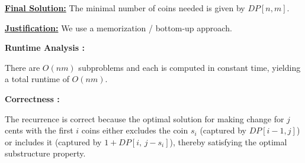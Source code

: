 \documentclass[11pt]{article}
\begin{document}
    \medskip
    
    \underline{\textbf{Final Solution:}} The minimal number of coins needed is given by \(DP[n,m]\).
    
    \medskip
    
    \underline{\textbf{Justification:}} We use a memorization / bottom-up approach. 

    \textbf{Runtime Analysis :}
    
    There are \(O(nm)\) subproblems and each is computed in constant time, yielding a total runtime of \(O(nm)\). 
    
    \textbf{Correctness :}

    The recurrence is correct because the optimal solution for making change for \(j\) cents with the first \(i\) coins either excludes the coin \(s_i\) (captured by \(DP[i-1,j]\)) or includes it (captured by \(1+DP[i,\, j-s_i]\)), thereby satisfying the optimal substructure property.
    \newpage

    
    
\end{document}
